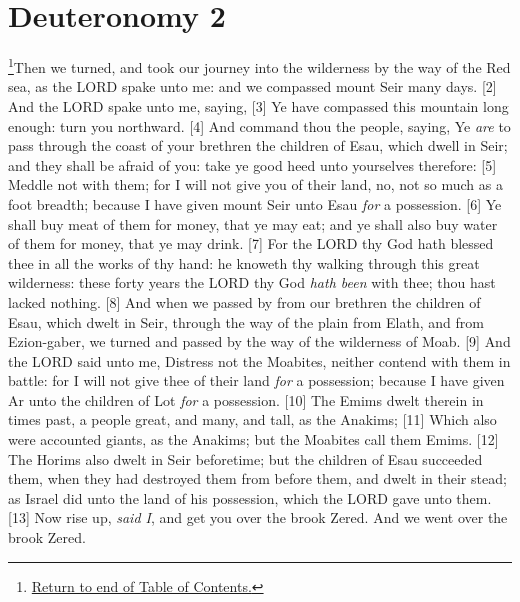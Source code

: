 \chapter{Deuteronomy 2}
\footnote{\textcolor[rgb]{0.00,0.25,0.00}{\hyperlink{DeuteronomyTOC}{Return to end of Table of Contents.}}}\textcolor[rgb]{0.00,0.00,1.00}{Then we turned, and took our journey into the wilderness by the way of the Red sea, as the LORD spake unto me: and we compassed mount Seir many days.}
[2] \textcolor[rgb]{0.00,0.00,1.00}{And the LORD spake unto me, saying,}
[3] \textcolor[rgb]{0.00,0.00,1.00}{Ye have compassed this mountain long enough: turn you northward.}
[4] \textcolor[rgb]{0.00,0.00,1.00}{And command thou the people, saying, Ye \emph{are} to pass through the coast of your brethren the children of Esau, which dwell in Seir; and they shall be afraid of you: take ye good heed unto yourselves therefore:}
[5] \textcolor[rgb]{0.00,0.00,1.00}{Meddle not with them; for I will not give you of their land, no, not so much as a foot breadth; because I have given mount Seir unto Esau \emph{for} a possession.}
[6] \textcolor[rgb]{0.00,0.00,1.00}{Ye shall buy meat of them for money, that ye may eat; and ye shall also buy water of them for money, that ye may drink.}
[7] \textcolor[rgb]{0.00,0.00,1.00}{For the LORD thy God hath blessed thee in all the works of thy hand: he knoweth thy walking through this great wilderness: these forty years the LORD thy God \emph{hath been} with thee; thou hast lacked nothing.}
[8] \textcolor[rgb]{0.00,0.00,1.00}{And when we passed by from our brethren the children of Esau, which dwelt in Seir, through the way of the plain from Elath, and from Ezion-gaber, we turned and passed by the way of the wilderness of Moab.}
[9] \textcolor[rgb]{0.00,0.00,1.00}{And the LORD said unto me, Distress not the Moabites, neither contend with them in battle: for I will not give thee of their land \emph{for} a possession; because I have given Ar unto the children of Lot \emph{for} a possession.}
[10] \textcolor[rgb]{0.00,0.00,1.00}{The Emims dwelt therein in times past, a people great, and many, and tall, as the Anakims;}
[11] \textcolor[rgb]{0.00,0.00,1.00}{Which also were accounted giants, as the Anakims; but the Moabites call them Emims.}
[12] \textcolor[rgb]{0.00,0.00,1.00}{The Horims also dwelt in Seir beforetime; but the children of Esau succeeded them, when they had destroyed them from before them, and dwelt in their stead; as Israel did unto the land of his possession, which the LORD gave unto them.}
[13] \textcolor[rgb]{0.00,0.00,1.00}{Now rise up, \emph{said I}, and get you over the brook Zered. And we went over the brook Zered.}
